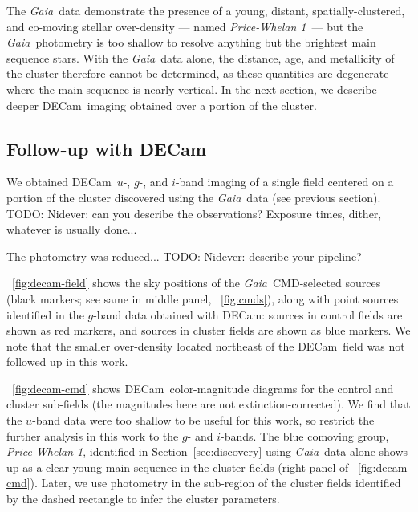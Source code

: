 \documentclass[twocolumn]{aastex62}
\newcommand{\gaia}{\textsl{Gaia}}
\newcommand{\decam}{DECam}
\newcommand{\todo}[1]{{\color{red} TODO: #1}}
\newcommand{\sectionname}{Section}
\newcommand{\clustername}{\textsl{Price-Whelan 1}}
\begin{document}
The \gaia\ data demonstrate the presence of a young, distant, spatially-clustered, and co-moving stellar over-density --- named \clustername\ --- but the \gaia\ photometry is too shallow to resolve anything but the brightest main sequence stars.
With the \gaia\ data alone, the distance, age, and metallicity of the cluster therefore cannot be determined, as these quantities are degenerate where the main sequence is nearly vertical.
In the next section, we describe deeper \decam\ imaging obtained over a portion of the cluster.


\subsection{Follow-up with \decam}
\label{sec:decam}

We obtained \decam\ $u$-, $g$-, and $i$-band imaging of a single field centered on a portion of the cluster discovered using the \gaia\ data (see previous section).
\todo{Nidever: can you describe the observations? Exposure times, dither, whatever is usually done...}

The photometry was reduced...\todo{Nidever: describe your pipeline?}

\figurename~\ref{fig:decam-field} shows the sky positions of the \gaia\ CMD-selected sources (black markers; see same in middle panel, \figurename~\ref{fig:cmds}), along with point sources identified in the $g$-band data obtained with \decam: sources in control fields are shown as red markers, and sources in cluster fields are shown as blue markers.
We note that the smaller over-density located northeast of the \decam\ field was not followed up in this work.

\figurename~\ref{fig:decam-cmd} shows \decam\ color-magnitude diagrams for the control and cluster sub-fields (the magnitudes here are not extinction-corrected).
We find that the $u$-band data were too shallow to be useful for this work, so restrict the further analysis in this work to the $g$- and $i$-bands.
The blue comoving group, \clustername, identified in \sectionname~\ref{sec:discovery} using \gaia\ data alone shows up as a clear young main sequence in the cluster fields (right panel of \figurename~\ref{fig:decam-cmd}).
Later, we use photometry in the sub-region of the cluster fields identified by the dashed rectangle to infer the cluster parameters.
\end{document}
